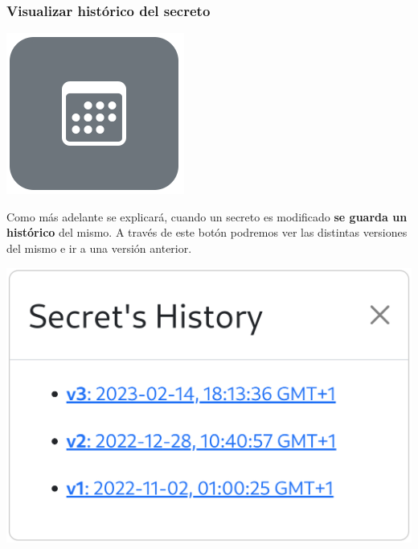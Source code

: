 \documentclass{\ClassPath/viu-tfm-template}
\begin{document}
\subsubsection*{Visualizar histórico del secreto}
{
\begin{minipage}{0.1\linewidth}
    \includegraphics[width=\linewidth]{img/calendar.png}
\end{minipage}
\hspace{0.5cm}
\begin{minipage}{0.9\linewidth}
    Como más adelante se explicará, cuando un secreto es modificado \textbf{se guarda un histórico} del mismo. A través de este botón podremos ver las distintas versiones del mismo e ir a una versión anterior.
\end{minipage}
}
\vspace{-8pt}
\begin{center}
    \includegraphics[width=0.56\linewidth]{img/history.png}
\end{center}
\end{document}
